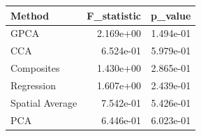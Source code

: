 \begin{tabular}{lrr}
\toprule
Method & F_statistic & p_value \\
\midrule
GPCA & 2.169e+00 & 1.494e-01 \\
CCA & 6.524e-01 & 5.979e-01 \\
Composites & 1.430e+00 & 2.865e-01 \\
Regression & 1.607e+00 & 2.439e-01 \\
Spatial Average & 7.542e-01 & 5.426e-01 \\
PCA & 6.446e-01 & 6.023e-01 \\
\bottomrule
\end{tabular}
